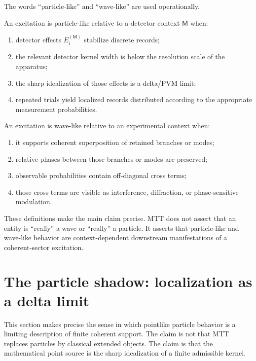 \documentclass[11pt]{article}
\newcommand{\Meas}{\mathsf M}
\begin{document}
The words ``particle-like'' and ``wave-like'' are used operationally.

\begin{definition}
\label{def:particle-like}
An excitation is particle-like relative to a detector context \(\Meas\) when:
\begin{enumerate}[label=(\roman*)]
  \item detector effects \(E_i^{(\Meas)}\) stabilize discrete records;
  \item the relevant detector kernel width is below the resolution scale of the apparatus;
  \item the sharp idealization of those effects is a delta/PVM limit;
  \item repeated trials yield localized records distributed according to the appropriate
  measurement probabilities.
\end{enumerate}
\end{definition}

\begin{definition}
\label{def:wave-like}
An excitation is wave-like relative to an experimental context when:
\begin{enumerate}[label=(\roman*)]
  \item it supports coherent superposition of retained branches or modes;
  \item relative phases between those branches or modes are preserved;
  \item observable probabilities contain off-diagonal cross terms;
  \item those cross terms are visible as interference, diffraction, or phase-sensitive
  modulation.
\end{enumerate}
\end{definition}

These definitions make the main claim precise. MTT does not assert that an entity is
``really'' a wave or ``really'' a particle. It asserts that particle-like and wave-like behavior
are context-dependent downstream manifestations of a coherent-sector excitation.



\section{The particle shadow: localization as a delta limit}
\label{sec:particle-shadow}

This section makes precise the sense in which pointlike particle behavior is a limiting
description of finite coherent support. The claim is not that MTT replaces particles by
classical extended objects. The claim is that the mathematical point source is the sharp
idealization of a finite admissible kernel.
\end{document}

